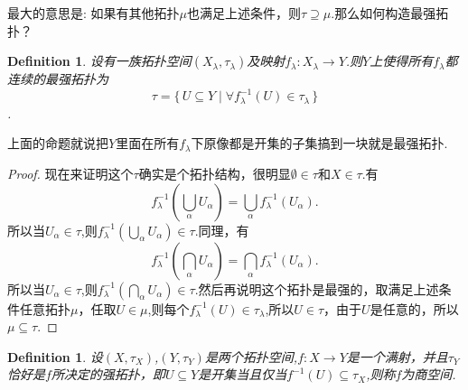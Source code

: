 \documentclass{article}
\newtheorem{definition}[theorem]{Definition}
\newcommand*{\xfunc}[4]{{#2}\colon{#3}{#1}{#4}}
\newcommand*{\func}[3]{\xfunc{\to}{#1}{#2}{#3}}
\newcommand\Set[2]{\{\,#1\mid#2\,\}} %
\begin{document}
最大的意思是: 如果有其他拓扑$\mu$也满足上述条件，则$\tau \supseteq \mu$.那么如何构造最强拓扑？

\begin{definition}
设有一族拓扑空间$(X_\lambda,\tau_\lambda)$及映射$\func{f_\lambda}{X_\lambda}{Y}$.则$Y$上使得所有$f_\lambda$都连续的最强拓扑为\[\tau = \Set{U \subseteq Y}{\forall f_\lambda^{-1}(U) \in \tau_\lambda}\].
\end{definition}

上面的命题就说把$Y$里面在所有$f_\lambda$下原像都是开集的子集搞到一块就是最强拓扑.

\begin{proof}
现在来证明这个$\tau$确实是个拓扑结构，很明显$\emptyset \in \tau$和$X \in \tau$.有\[f^{-1}_\lambda(\bigcup\limits_{\alpha} U_\alpha)=\bigcup\limits_\alpha f_\lambda^{-1}(U_\alpha).\]所以当$U_\alpha \in \tau$,则$f^{-1}_\lambda(\bigcup\limits_{\alpha} U_\alpha) \in \tau$.同理，有\[f^{-1}_\lambda(\bigcap\limits_{\alpha} U_\alpha)=\bigcap\limits_\alpha f_\lambda^{-1}(U_\alpha).\]所以当$U_\alpha \in \tau$,则$f^{-1}_\lambda(\bigcap\limits_{\alpha} U_\alpha) \in \tau$.然后再说明这个拓扑是最强的，取满足上述条件任意拓扑$\mu$，任取$U \in \mu$,则每个$f_\lambda^{-1}(U) \in \tau_\lambda$,所以$U \in \tau$，由于$U$是任意的，所以$\mu \subseteq \tau$.
\end{proof}

\begin{definition}
设$(X,\tau_X)$,$(Y,\tau_Y)$是两个拓扑空间,$\func{f}{X}{Y}$是一个满射，并且$\tau_Y$恰好是$f$所决定的强拓扑，即$U \subseteq Y$是开集当且仅当$f^{-1}(U) \subseteq \tau_X$,则称$f$为商空间.
\end{definition}
\end{document}

